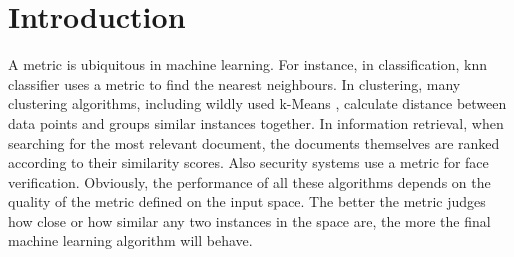 \documentclass[12pt,a4paper]{report}
\begin{document}



\tableofcontents







\chapter{Introduction} \label{chap:intro}


A metric is ubiquitous in machine learning. For instance, in classification, \ac{knn} classifier \citep{cover1967nearest} uses a metric to find the nearest neighbours. In clustering, many clustering algorithms, including wildly used k-Means \citep{hartigan1979algorithm}, calculate distance between data points and groups similar instances together. In information retrieval, when searching for the most relevant document, the documents themselves are ranked according to their similarity scores. Also security systems use a metric for face verification. Obviously, the performance of all these algorithms depends on the quality of the metric defined on the input space. The better the metric judges how close or how similar any two instances in the space are, the more the final machine learning algorithm will behave.
\end{document}
